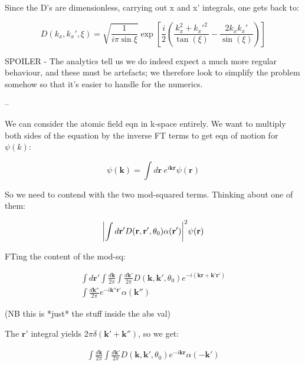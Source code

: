 \documentclass[a4paper,twocolumn,nobalancelastpage]{revtex4-1}
\DeclarePairedDelimiter\abs{\lvert}{\rvert}
\begin{document}
Since the D's are dimensionless, carrying out x and x' integrals, one gets back to:

\begin{equation}
D(k_x,k_{x}',\xi)=\sqrt{\frac{1}{i \pi \sin{\xi}}} \exp{\left[ \frac{i }{2 } \left(
\frac{k_x^2+k_x'^2}{\tan(\xi)}-\frac{2 k_x k_x'}{\sin(\xi)}  
\right) \right] } 
\end{equation}

SPOILER - The analytics tell us we do indeed expect a much more regular behaviour, and these must be artefacts; we therefore look to simplify the problem somehow so that it's easier to handle for the numerics.

--

We can consider the atomic field eqn in k-space entirely. We want to multiply both sides of the equation by the inverse FT terms to get eqn of motion for $\psi(k)$:

\begin{equation}
\psi(\textbf{k})= \int d\textbf{r} \  e^{i\textbf{k} \textbf{r}} \psi(\textbf{r})
\end{equation}

So we need to contend with the two mod-squared terms. Thinking about one of them:

\begin{equation}
  \abs*{ \int d\textbf{r}' D(\textbf{r}, \textbf{r}',\theta_0) \alpha(\textbf{r}')} ^2 \psi(\textbf{r})
\end{equation}


FTing the content of the mod-sq:


\begin{multline}
\int d \textbf{r}' \int \frac{d \textbf{k}}{2 \pi} \int \frac{d \textbf{k}'}{2 \pi} D(\textbf{k},\textbf{k}',\theta_0) e^{-i (\textbf{k} \textbf{r}+\textbf{k}' \textbf{r}')} \\ \int \frac{d \textbf{k}''}{2 \pi} e^{-i \textbf{k}'' \textbf{r}'} \alpha(\textbf{k}'')
\end{multline}

(NB this is *just* the stuff inside the abs val)

The $\textbf{r}'$ integral yields $2 \pi \delta(\textbf{k}'+\textbf{k}'')$, so we get:

\begin{multline}
\int \frac{d \textbf{k}}{2 \pi} \int \frac{d \textbf{k}'}{2 \pi} D(\textbf{k},\textbf{k}',\theta_0) e^{-i \textbf{k} \textbf{r}} \alpha(-\textbf{k}')
\end{multline}
\end{document}
